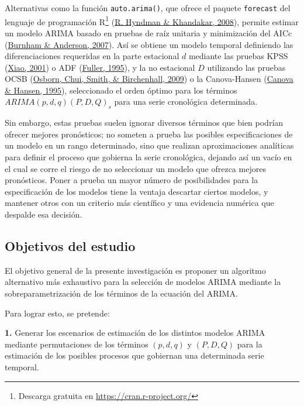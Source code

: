 \documentclass[
]{article}
\begin{document}
Alternativas como la función \texttt{auto.arima()}, que ofrece el
paquete \texttt{forecast} del lenguaje de programación R\footnote{Descarga
  gratuita en \url{https://cran.r-project.org/}}
(\protect\hyperlink{ref-auto.arima}{R. Hyndman \& Khandakar, 2008}),
permite estimar un modelo ARIMA basado en pruebas de raíz unitaria y
minimización del AICc (\protect\hyperlink{ref-burnham2007model}{Burnham
\& Anderson, 2007}). Así se obtiene un modelo temporal definiendo las
diferenciaciones requeridas en la parte estacional \(d\) mediante las
pruebas KPSS
(\protect\hyperlink{ref-doi:10.1111ux2f1467-9892.00213}{Xiao, 2001}) o
ADF (\protect\hyperlink{ref-fuller1995introduction}{Fuller, 1995}), y la
no estacional \(D\) utilizando las pruebas OCSB
(\protect\hyperlink{ref-Osborn2009SEASONALITYAT}{Osborn, Chui, Smith, \&
Birchenhall, 2009}) o la Canova-Hansen
(\protect\hyperlink{ref-10.2307ux2f1392184}{Canova \& Hansen, 1995}),
seleccionado el orden óptimo para los términos
\(ARIMA(p, d, q)(P, D, Q)_s\) para una serie cronológica determinada.

Sin embargo, estas pruebas suelen ignorar diversos términos que bien
podrían ofrecer mejores pronósticos; no someten a prueba las posibles
especificaciones de un modelo en un rango determinado, sino que realizan
aproximaciones analíticas para definir el proceso que gobierna la serie
cronológica, dejando así un vacío en el cual se corre el riesgo de no
seleccionar un modelo que ofrezca mejores pronósticos. Poner a prueba un
mayor número de posibilidades para la especificación de los modelos
tiene la ventaja descartar ciertos modelos, y mantener otros con un
criterio más científico y una evidencia numérica que despalde esa
decisión.

\subsection{Objetivos del estudio}

El objetivo general de la presente investigación es proponer un
algoritmo alternativo más exhaustivo para la selección de modelos ARIMA
mediante la sobreparametrización de los términos de la ecuación del
ARIMA.

Para lograr esto, se pretende:

\textbf{1.} Generar los escenarios de estimación de los distintos
modelos ARIMA mediante permutaciones de los términos \((p,d,q)\) y
\((P,D,Q)\) para la estimación de los posibles procesos que gobiernan
una determinada serie temporal.
\end{document}

